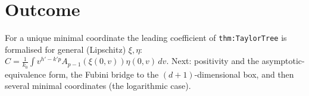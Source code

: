 \documentclass[11pt]{article}
\begin{document}
\section{Outcome}
For a unique minimal coordinate the leading coefficient of \texttt{thm:TaylorTree} is formalised for
general (Lipschitz) $\xi,\eta$: $C=\frac1{k_0}\int v^{h'-k'p}A_{p-1}(\xi(0,v))\eta(0,v)\,dv$. Next:
positivity and the asymptotic-equivalence form, the Fubini bridge to the $(d+1)$-dimensional box, and
then several minimal coordinates (the logarithmic case).
\end{document}
